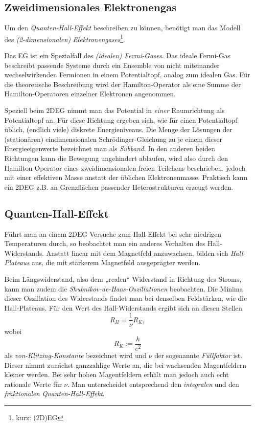 \subsection{Zweidimensionales Elektronengas}
Um den \emph{Quanten-Hall-Effekt} beschreiben zu können, benötigt man das Modell des \emph{(2-dimensionalen) Elektronengases}\footnote{kurz: (2D)EG}.

Das EG ist ein Spezialfall des \emph{(idealen) Fermi-Gases}. Das ideale Fermi-Gas beschreibt passende Systeme durch ein Ensemble von nicht miteinander wechselwirkenden Fermionen in einem Potentialtopf, analog zum idealen Gas.
Für die theoretische Beschreibung wird der Hamilton-Operator als eine Summe der Hamilton-Operatoren einzelner Elektronen angenommen.

Speziell beim 2DEG nimmt man das Potential in \emph{einer} Raumrichtung als Potentialtopf an. Für diese Richtung ergeben sich, wie für einen Potentialtopf üblich, (endlich viele) diskrete Energieniveaus. Die Menge der Lösungen der (stationären) eindimensionalen Schrödinger-Gleichung zu je einem dieser Energieeigenwerte bezeichnet man als \emph{Subband}.
In den anderen beiden Richtungen kann die Bewegung ungehindert ablaufen, wird also durch den Hamilton-Operator eines zweidimensionalen freien Teilchens beschrieben, jedoch mit einer effektiven Masse anstatt der üblichen Elektronenmasse.
Praktisch kann ein 2DEG z.B. an Grenzflächen passender Heterostrukturen erzeugt werden.

\clearpage

\subsection{Quanten-Hall-Effekt}\label{sec:Quanten-Hall-Effekt}
Führt man an einem 2DEG Versuche zum Hall-Effekt bei sehr niedrigen Temperaturen durch, so beobachtet man ein anderes Verhalten des Hall-Widerstands. Anstatt linear mit dem Magnetfeld anzuwachsen, bilden sich \emph{Hall-Plateaus} aus, die mit stärkerem Magnetfeld ausgeprägter werden.

Beim Längswiderstand, also dem „realen“ Widerstand in Richtung des Stroms, kann man zudem die \emph{Shubnikov-de-Haas-Oszillationen} beobachten. Die Minima dieser Oszillation des Widerstands findet man bei denselben Feldstärken, wie die Hall-Plateaus. Für den Wert des Hall-Widerstands ergibt sich an diesen Stellen
\begin{equation}\label{eq:HallvKl}
R_H = \frac{1}{\nu}R_K,
\end{equation}
wobei
\begin{equation}\label{eq:vKlitzing}
R_K := \frac{h}{e^2}
\end{equation}
als \emph{von-Klitzing-Konstante} bezeichnet wird und $\nu$ der sogenannte \emph{Füllfaktor} ist. Dieser nimmt zunächst ganzzahlige Werte an, die bei wachsenden Magentfeldern kleiner werden. Bei sehr hohen Magentfeldern erhält man jedoch auch echt rationale Werte für $\nu$. Man unterscheidet entsprechend den \emph{integralen} und den \emph{fraktionalen Quanten-Hall-Effekt}.

